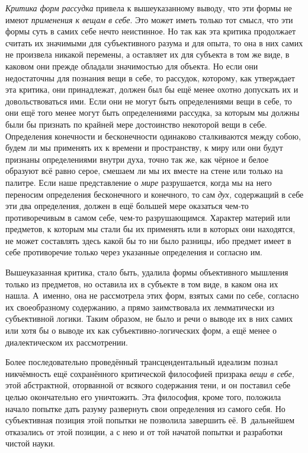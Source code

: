 {\em Критика форм рассудка} привела к вышеуказанному
выводу, что эти формы не имеют {\em применения к вещам
в себе}. Это может иметь только тот смысл, что эти формы суть в самих себе
нечто неистинное. Но так как эта критика продолжает считать их значимыми
для субъективного разума и для опыта, то она в них самих не произвела
никакой перемены, а оставляет их для субъекта в том же виде, в каковом они
прежде обладали значимостью для объекта. Но если они недостаточны для
познания вещи в себе, то рассудок, которому, как утверждает эта критика,
они принадлежат, должен был бы ещё менее охотно допускать их и
довольствоваться ими. Если они не могут быть определениями вещи в себе, то
они ещё того менее могут быть определениями рассудка, за которым мы должны
были бы признать по крайней мере достоинство некоторой вещи в себе.
Определения конечности и бесконечности одинаково сталкиваются между собою,
будем ли мы применять их к времени и пространству, к миру или они будут
признаны определениями внутри духа, точно так же, как чёрное и белое
образуют всё равно серое, смешаем ли мы их вместе на стене или только на
палитре. Если наше представление о {\em мире}
разрушается, когда мы на него переносим определения бесконечного и
конечного, то сам {\em дух,} содержащий в себе эти два
определения, должен в ещё большей мере оказаться чем-то противоречивым в
самом себе, чем-то разрушающимся. Характер материй или предметов, к которым
мы стали бы их применять или в которых они находятся, не может составлять
здесь какой бы то ни было разницы, ибо предмет имеет в себе противоречие
только через указанные определения и согласно им.

Вышеуказанная критика, стало быть, удалила формы объективного мышления
только из предметов, но оставила их в субъекте в том виде, в каком она их
нашла. А~именно, она не рассмотрела этих форм, взятых сами по себе,
согласно их своеобразному содержанию, а прямо заимствовала их лемматически
из субъективной логики. Таким образом, не было и речи о выводе их в них
самих или хотя бы о выводе их как субъективно-логических форм, а ещё менее
о диалектическом их рассмотрении.

Более последовательно проведённый трансцендентальный идеализм познал
никчёмность ещё сохранённого критической философией призрака
{\em вещи в себе,} этой абстрактной, оторванной от
всякого содержания тени, и он поставил себе целью окончательно его
уничтожить.
Эта философия, кроме того, положила начало попытке дать разуму развернуть
свои определения из самого себя. Но субъективная позиция этой попытки не
позволила завершить её. В~дальнейшем отказались от этой позиции, а с нею и
от той начатой попытки и разработки чистой науки.

